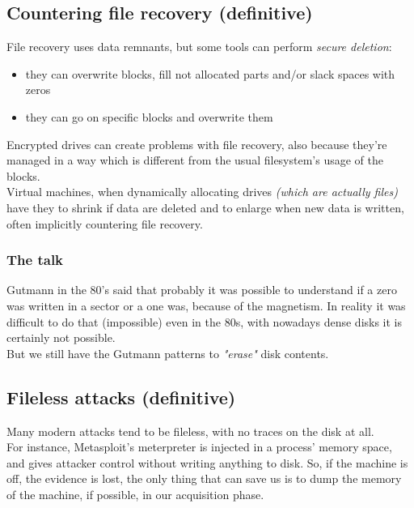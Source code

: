     \subsection{Countering file recovery (definitive)}
        File recovery uses data remnants, but some tools can perform \textit{secure deletion}: 
        \begin{itemize}
            \item they can overwrite blocks, fill not allocated parts and/or slack spaces with zeros
            \item they can go on specific blocks and overwrite them
        \end{itemize}
        Encrypted drives can create problems with file recovery, also because they're managed in a way which is different from the usual filesystem's usage of the blocks.\\
        Virtual machines, when dynamically allocating drives \textit{(which are actually files)} have they to shrink if data are deleted and to enlarge when new data is written, often implicitly countering file recovery.
        \subsubsection*{The talk}
            Gutmann in the 80's said that probably it was possible to understand if a zero was written in a sector or a one was, because of the magnetism. In reality it was difficult to do that (impossible) even in the 80s, with nowadays dense disks it is certainly not possible.\\
            But we still have the Gutmann patterns to \textit{"erase"} disk contents.
    \subsection{Fileless attacks (definitive)}
        Many modern attacks tend to be fileless, with no traces on the disk at all.\\
        For instance, Metasploit's meterpreter is injected in a process' memory space, and gives attacker control without writing anything to disk.
        So, if the machine is off, the evidence is lost, the only thing that can save us is to dump the memory of the machine, if possible, in our acquisition phase.
